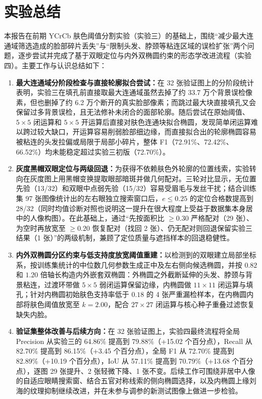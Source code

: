\section{实验总结}\label{sec:conclusion}

本报告在前期 YCrCb 肤色阈值分割实验（实验三）的基础上，围绕“减少最大连通域筛选造成的脸部碎片丢失”与“限制头发、脖颈等粘连区域的误检扩张”两个问题，逐步尝试并完成了基于双眼定位与内外双椭圆约束的形态学改进流程（实验四）。主要工作与认识总结如下：

\begin{enumerate}
\item \textbf{最大连通域分阶段检查与直接轮廓拟合尝试：}在 32 张验证图上的分阶段统计表明，实验三在填孔前直接取最大连通域虽然去掉了约 33.7 万个背景误检像素，但也删掉了约 6.2 万个断开的真实脸部像素；而跳过最大块直接填孔又会保留过多背景误检，且无法修补未闭合的面部轮廓。随后尝试在原始阈值、$5\times5$ 闭运算和 $5\times5$ 开运算后直接对肤色连通块拟合椭圆，发现简单闭运算难以跨过较大缺口，开运算容易削弱脸部细边缘，而直接拟合出的轮廓椭圆容易被粘连的头发拉偏或局限于局部小碎片，整体 F1（72.91\%、72.42\%、66.52\%）均未能稳定超过实验三初版（72.70\%）。
\item \textbf{灰度黑帽双眼定位与两级回退：}为获得不依赖肤色外轮廓的位置线索，实验转向在灰度图上用黑帽变换提取眼部暗斑并做几何配对。三轮对比显示，无位置先验（13/32）和双眼中点弱先验（15/32）容易受眉毛与发丝干扰；结合训练集 97 张图像统计出的左右眼独立搜索窗口后，$e\le 0.25$ 的定位合格数提高到 28/32（同时均值诊断对照也说明这一提升在很大程度上受益于数据集本身居中的人像构图）。在此基础上，通过“先按面积比 $\ge 0.30$ 严格配对（29 张）、为空时再放宽至 $\ge 0.20$ 恢复配对（找回 2 张）、仍无配对则回退保留实验三结果（1 张）”的两级机制，兼顾了定位质量与遮挡样本的回退稳健性。
\item \textbf{内外双椭圆分区约束与低支持度放宽阈值重建：}以检测到的双眼建立局部坐标系，按训练集统计的中位数几何参数生成正中及左右侧向候选椭圆，并按 $0.82$ 和 $1.20$ 倍轴长构造内外嵌套双椭圆：外椭圆之外截断延伸的头发、脖颈与背景粘连，过渡环带做 $5\times5$ 弱闭运算保留边缘，内椭圆做 $11\times11$ 闭运算与填孔；针对内椭圆初始肤色支持率低于 $0.18$ 的 4 张严重漏检样本，在内椭圆内部将肤色阈值放宽至 $k=2.00$，配合 $27\times27$ 闭运算与核心种子重叠过滤恢复缺失内脸。
\item \textbf{验证集整体改善与后续方向：}在 32 张验证图上，实验四最终流程将全局 Precision 从实验三的 64.86\% 提高到 79.88\%（+15.02 个百分点），Recall 从 82.70\% 提高到 86.15\%（+3.45 个百分点），全局 F1 从 72.70\% 提高到 82.89\%（+10.19 个百分点），IoU 从 57.11\% 提高到 70.79\%（+13.68 个百分点），逐图 29 张提升、2 张轻微下降、1 张不变。后续工作可围绕非居中人像的自适应眼睛搜索窗、结合五官对称线索的侧向椭圆选择，以及内椭圆上缘刘海的纹理抑制继续改进，并在未参与调参的新测试图像上做进一步检验。
\end{enumerate}
